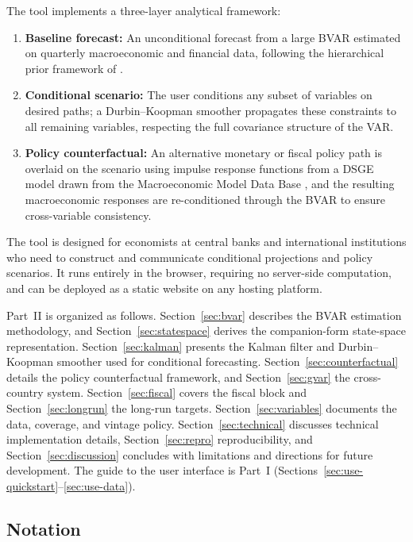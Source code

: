\documentclass[11pt]{article}
\theoremstyle{definition}
\theoremstyle{remark}
\begin{document}
The tool implements a three-layer analytical framework:
\begin{enumerate}[label=(\roman*)]
  \item \textbf{Baseline forecast:} An unconditional forecast from a
    large BVAR estimated on quarterly macroeconomic and financial data,
    following the hierarchical prior framework of \citet{Giannone2015}.
  \item \textbf{Conditional scenario:} The user conditions any subset
    of variables on desired paths; a Durbin--Koopman smoother
    \citep{DurbinKoopman2002, DurbinKoopman2012} propagates these
    constraints to all remaining variables, respecting the full
    covariance structure of the VAR.
  \item \textbf{Policy counterfactual:} An alternative monetary or
    fiscal policy path is overlaid on the scenario using impulse
    response functions from a DSGE model drawn from the Macroeconomic
    Model Data Base \citep[MMB;][]{WielandCwikMuellerSchmidtWolters2012},
    and the resulting macroeconomic responses are re-conditioned through
    the BVAR to ensure cross-variable consistency.
\end{enumerate}

The tool is designed for economists at central banks and international
institutions who need to construct and communicate conditional
projections and policy scenarios.  It runs entirely in the browser,
requiring no server-side computation, and can be deployed as a static
website on any hosting platform.

Part~II is organized as follows.  Section~\ref{sec:bvar}
describes the BVAR estimation methodology, and
Section~\ref{sec:statespace} derives the companion-form state-space
representation.  Section~\ref{sec:kalman} presents the Kalman filter
and Durbin--Koopman smoother used for conditional forecasting.
Section~\ref{sec:counterfactual} details the policy counterfactual
framework, and Section~\ref{sec:gvar} the cross-country system.
Section~\ref{sec:fiscal} covers the fiscal block and
Section~\ref{sec:longrun} the long-run targets.
Section~\ref{sec:variables} documents the data, coverage, and vintage
policy.  Section~\ref{sec:technical} discusses technical
implementation details, Section~\ref{sec:repro} reproducibility, and
Section~\ref{sec:discussion} concludes with limitations and directions
for future development.  The guide to the user interface is Part~I
(Sections~\ref{sec:use-quickstart}--\ref{sec:use-data}).

\subsection{Notation}\label{sec:notation}
\end{document}
